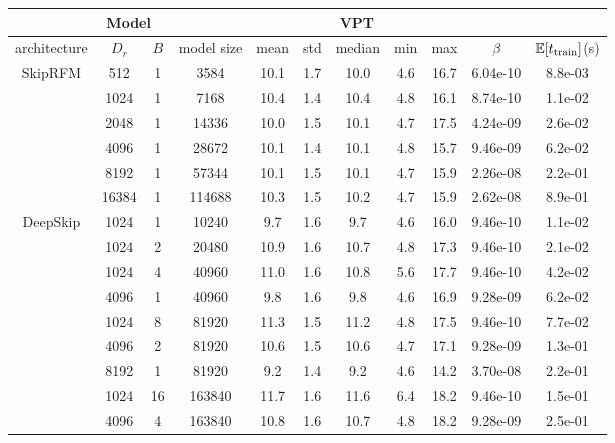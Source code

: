 \begin{table}[!htp]
    \centering
    \begin{tabular}{|c|c|c|c|c|c|c|c|c|c|c|} \hline
\multicolumn{4}{|c|}{Model} &\multicolumn{5}{c|}{VPT} & \multicolumn{2}{c|}{}\\ \hline
architecture & $D_r$ & $B$ & model size & mean & std & median & min & max &$\beta$ & $\mathbb{E}[t_{\rm train}]$(s)\\ \hline\hline
\multirow{6}{*}{SkipRFM} & 512 & 1 & 3584 & 10.1 & 1.7 & 10.0 & 4.6 & 16.7 & 6.04e-10 & 8.8e-03\\ \cline{2-11}
 & \cellcolor{pink}1024 & \cellcolor{pink}1 & \cellcolor{pink}7168 & \cellcolor{pink}10.4 & \cellcolor{pink}1.4 & \cellcolor{pink}10.4 & \cellcolor{pink}4.8 & \cellcolor{pink}16.1 & \cellcolor{pink}8.74e-10 & \cellcolor{pink}1.1e-02\\ \cline{2-11}
 & 2048 & 1 & 14336 & 10.0 & 1.5 & 10.1 & 4.7 & 17.5 & 4.24e-09 & 2.6e-02\\ \cline{2-11}
 & 4096 & 1 & 28672 & 10.1 & 1.4 & 10.1 & 4.8 & 15.7 & 9.46e-09 & 6.2e-02\\ \cline{2-11}
 & 8192 & 1 & 57344 & 10.1 & 1.5 & 10.1 & 4.7 & 15.9 & 2.26e-08 & 2.2e-01\\ \cline{2-11}
 & 16384 & 1 & 114688 & 10.3 & 1.5 & 10.2 & 4.7 & 15.9 & 2.62e-08 & 8.9e-01\\ \cline{2-11}
\hline\hline
\multirow{15}{*}{DeepSkip} & 1024 & 1 & 10240 & 9.7 & 1.6 & 9.7 & 4.6 & 16.0 & 9.46e-10 & 1.1e-02\\ \cline{2-11}
 & 1024 & 2 & 20480 & 10.9 & 1.6 & 10.7 & 4.8 & 17.3 & 9.46e-10 & 2.1e-02\\ \cline{2-11}
 & 1024 & 4 & 40960 & 11.0 & 1.6 & 10.8 & 5.6 & 17.7 & 9.46e-10 & 4.2e-02\\ \cline{2-11}
 & 4096 & 1 & 40960 & 9.8 & 1.6 & 9.8 & 4.6 & 16.9 & 9.28e-09 & 6.2e-02\\ \cline{2-11}
 & 1024 & 8 & 81920 & 11.3 & 1.5 & 11.2 & 4.8 & 17.5 & 9.46e-10 & 7.7e-02\\ \cline{2-11}
 & 4096 & 2 & 81920 & 10.6 & 1.5 & 10.6 & 4.7 & 17.1 & 9.28e-09 & 1.3e-01\\ \cline{2-11}
 & 8192 & 1 & 81920 & 9.2 & 1.4 & 9.2 & 4.6 & 14.2 & 3.70e-08 & 2.2e-01\\ \cline{2-11}
 & 1024 & 16 & 163840 & 11.7 & 1.6 & 11.6 & 6.4 & 18.2 & 9.46e-10 & 1.5e-01\\ \cline{2-11}
 & 4096 & 4 & 163840 & 10.8 & 1.6 & 10.7 & 4.8 & 18.2 & 9.28e-09 & 2.5e-01\\ \cline{2-11}

\end{tabular}
\end{table}
